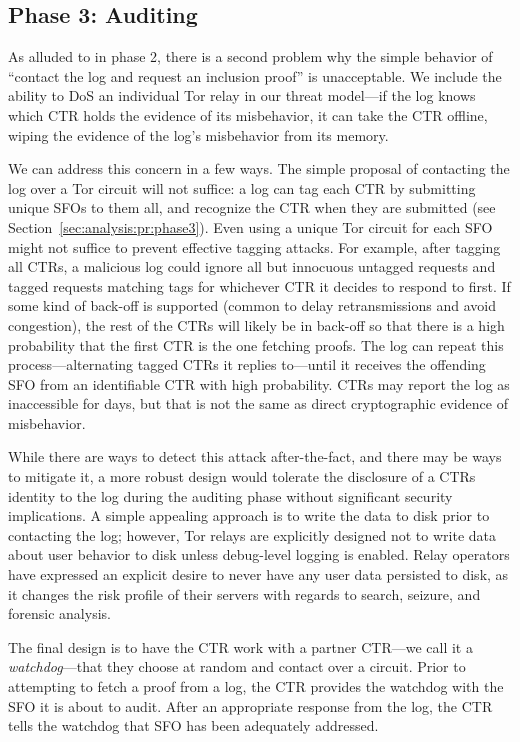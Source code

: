 \subsection{Phase 3: Auditing} \label{sec:base:phase3}

As alluded to in phase 2, there is a second problem why the simple behavior of
``contact the log and request an inclusion proof'' is unacceptable. We include
the ability to DoS an individual Tor relay in our threat model---if the log
knows which CTR holds the evidence of its misbehavior, it can take the CTR
offline, wiping the evidence of the log's misbehavior from its memory. 

We can address this concern in a few ways. The simple proposal of contacting the
log over a Tor circuit will not suffice:
	a log can tag each CTR by submitting unique SFOs to them all, and
	recognize the CTR when they are submitted (see
	Section~\ref{sec:analysis:pr:phase3}).
Even using a unique Tor circuit for each SFO might not suffice to prevent
effective tagging attacks. For example, after tagging all CTRs, a malicious log
could ignore all but innocuous untagged requests and tagged requests matching
tags for whichever CTR it decides to respond to first. If some kind of
back-off is supported (common to delay retransmissions and avoid congestion),
the rest of the CTRs will likely be in back-off so that there is a high
probability that the first CTR is the one fetching proofs.  The log can repeat
this process---alternating tagged CTRs it replies to---until it receives the
offending SFO from an identifiable CTR with high probability.  CTRs may report
the log as inaccessible for days, but that is not the same as direct
cryptographic evidence of misbehavior.

While there are ways to detect this attack after-the-fact, and there may be ways
to mitigate it, a more robust design would tolerate the disclosure of a CTRs
identity to the log during the auditing phase without significant security
implications.  A simple appealing approach is to write the data to disk prior
to contacting the log; however, Tor relays are explicitly designed not to write
data about user behavior to disk unless debug-level logging is enabled. Relay
operators have expressed an explicit desire to never have any user data
persisted to disk, as it changes the risk profile of their servers with regards
to search, seizure, and forensic analysis.

The final design is to have the CTR work with a partner CTR---we call it a
\emph{watchdog}---that they choose at random and contact over a circuit. Prior
to attempting to fetch a proof from a log, the CTR provides the watchdog with
the SFO it is about to audit. After an appropriate response from the log, the
CTR tells the watchdog that SFO has been adequately addressed.

